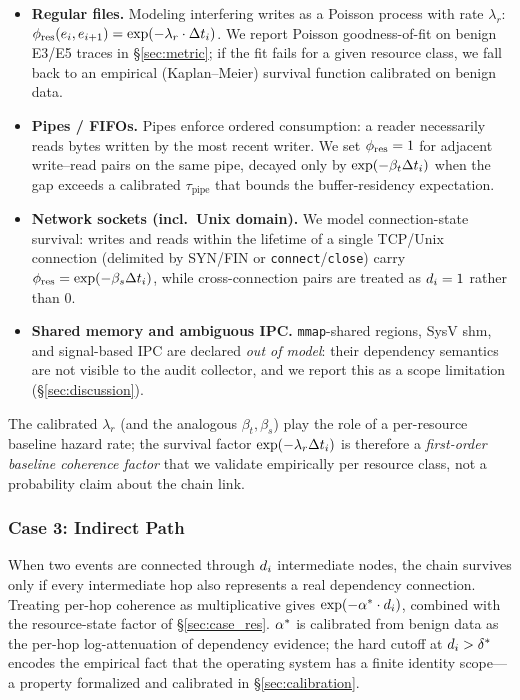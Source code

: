 \begin{itemize}
\item \textbf{Regular files.} Modeling interfering writes as a Poisson process with rate $\lambda_r$: $\phi_{\text{res}}(e_i, e_{i+1}) = \exp(-\lambda_r \cdot \Delta t_i)$. We report Poisson goodness-of-fit on benign E3/E5 traces in \S\ref{sec:metric}; if the fit fails for a given resource class, we fall back to an empirical (Kaplan--Meier) survival function calibrated on benign data.
\item \textbf{Pipes / FIFOs.} Pipes enforce ordered consumption: a reader necessarily reads bytes written by the most recent writer. We set $\phi_{\text{res}} = 1$ for adjacent write--read pairs on the same pipe, decayed only by $\exp(-\beta_t \Delta t_i)$ when the gap exceeds a calibrated $\tau_{\text{pipe}}$ that bounds the buffer-residency expectation.
\item \textbf{Network sockets (incl.\ Unix domain).} We model connection-state survival: writes and reads within the lifetime of a single TCP/Unix connection (delimited by SYN/FIN or \texttt{connect}/\texttt{close}) carry $\phi_{\text{res}} = \exp(-\beta_s \Delta t_i)$, while cross-connection pairs are treated as $d_i = 1$ rather than $0$.
\item \textbf{Shared memory and ambiguous IPC.} \texttt{mmap}-shared regions, SysV shm, and signal-based IPC are declared \emph{out of model}: their dependency semantics are not visible to the audit collector, and we report this as a scope limitation (\S\ref{sec:discussion}).
\end{itemize}

The calibrated $\lambda_r$ (and the analogous $\beta_t, \beta_s$) play the role of a per-resource baseline hazard rate; the survival factor $\exp(-\lambda_r \Delta t_i)$ is therefore a \emph{first-order baseline coherence factor} that we validate empirically per resource class, not a probability claim about the chain link.

\subsubsection{Case 3: Indirect Path}

When two events are connected through $d_i$ intermediate nodes, the chain survives only if every intermediate hop also represents a real dependency connection. Treating per-hop coherence as multiplicative gives $\exp(-\alpha^* \cdot d_i)$, combined with the resource-state factor of \S\ref{sec:case_res}. $\alpha^*$ is calibrated from benign data as the per-hop log-attenuation of dependency evidence; the hard cutoff at $d_i > \delta^*$ encodes the empirical fact that the operating system has a finite identity scope---a property formalized and calibrated in \S\ref{sec:calibration}.

